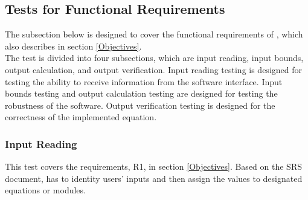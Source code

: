 \documentclass[12pt, titlepage]{article}
\begin{document}
\subsection{Tests for Functional Requirements}

The subsection below is designed to cover the functional requirements of
\progname, which also describes in section \ref{Objectives}.\\
The test is divided into four subsections, which are input reading, input
bounds,
output calculation, and output verification. Input reading testing is designed
for
testing the ability to receive information from the software interface. Input
bounds
testing and output calculation testing are designed for testing the robustness
of the
software. Output verification testing is designed for the correctness of the 
implemented equation.

 

\subsubsection{Input Reading}

This test covers the requirements, R1, in section \ref{Objectives}. Based on
the SRS document\cite{YS2019}, \progname has to identity users' inputs and
then assign the values to designated equations or modules.

\end{document}
